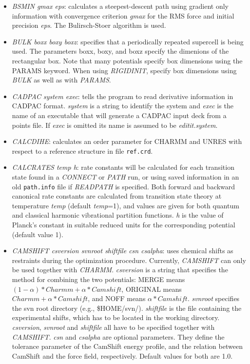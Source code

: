 \documentclass[12pt,a4paper,dvips]{article}
\begin{document}
\begin{itemize}
\item {\it BSMIN gmax eps\/}: calculates a steepest-descent path using gradient only
      information with convergence criterion {\it gmax\/} for the RMS force and initial
      precision {\it eps\/}. The Bulirsch-Stoer algorithm is used.

\item {\it BULK boxx boxy boxz\/}: specifies that a periodically repeated supercell is being used.
  The parameters boxx, boxy, and boxz specify the dimenions of the
  rectangular box.  Note that many potentials specify box dimensions using the
  PARAMS keyword. When using {\it RIGIDINIT}, specify box dimensions using {\it BULK} as well as with {\it PARAMS}. 

\item {\it CADPAC system exec\/}: tells the program to read derivative information in
CADPAC format. {\it system\/} is a string to identify the system and {\it exec\/} is
the name of an executable that will generate a CADPAC input deck from a points file.
If {\it exec\/} is omitted its name is assumed to be {\it editit.system}.

\item {\it CALCDIHE\/}: calculates an order parameter for CHARMM and UNRES with respect to
a reference structure in file {\tt ref.crd}.

\item {\it CALCRATES temp h\/}: rate constants will be calculated for each transition state
found in a {\it CONNECT\/} or {\it PATH\/} run, or using saved information in an
old {\tt path.info} file if {\it READPATH\/} is specified. Both forward and backward canonical
rate constants are calculated from transition state theory at temperature {\it temp\/} (default
{\it temp\/}=1), and values are given
for both quantum and classical harmonic vibrational partition functions. {\it h\/} is the
value of Planck's constant in suitable reduced units for the corresponding potential (default value 1).

\item {\it CAMSHIFT csversion svnroot shiftfile csn csalpha\/}: uses chemical shifts as restraints during the
optimization procedure. Currently, {\it CAMSHIFT} can only be used together with {\it CHARMM}.
{\it csversion} is a string that specifies the method for combining the two potentials: MERGE means $(1-\alpha)*Charmm + \alpha*Camshift$,
ORIGINAL means $Charmm + \alpha*Camshift$, and NOFF means $\alpha*Camshift$.
{\it svnroot} specifies the svn root directory (e.g., \$HOME/svn/). {\it shiftfile} is the file containing the
experimental shifts, which has to be located in the working directory. {\it csversion}, {\it svnroot} and {\it shiftfile} all have to be
specified together with {\it CAMSHIFT}. {\it csn} and {\it csalpha} are optional parameters. They define the
tolerance parameter of the CamShift energy profile, and the relation between CamShift and the force field, respectively.
Default values for both are 1.0.


\end{itemize}
\end{document}

